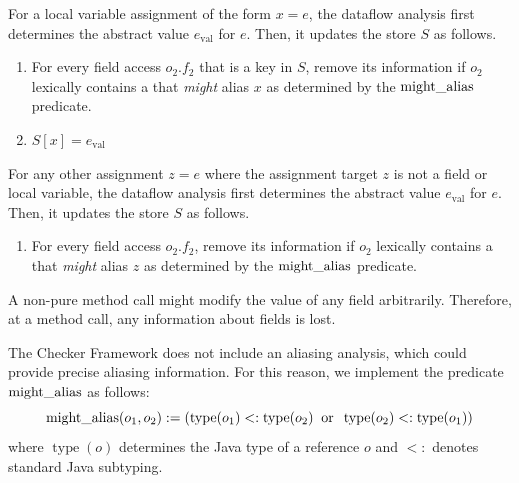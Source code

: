
For a local variable assignment of the form $x = e$,
the dataflow analysis first determines the abstract value $e_\text{val}$ for
$e$.
Then, it updates the store $S$ as follows.
\begin{enumerate}
    \item For every field access $o_2.f_2$ that is a key in $S$,
      remove its information if $o_2$ lexically contains a
       that \emph{might} alias $x$ as determined
      by the $\operatorname{might\_alias}$ predicate.
    \item $S[x] = e_\text{val}$
\end{enumerate}


For any other assignment $z = e$ where the
assignment target $z$ is not a field or local variable,
the dataflow analysis first determines the abstract value $e_\text{val}$ for
$e$.
Then, it updates the store $S$ as follows.
\begin{enumerate}
    \item For every field access $o_2.f_2$, remove its information if
    $o_2$ lexically contains a  that \emph{might}
    alias $z$ as determined by the $\operatorname{might\_alias}$ predicate.
\end{enumerate}



A non-pure method call might modify the value of any field arbitrarily.
Therefore, at a method call, any information about fields is lost.


\label{sec:alias}

The Checker Framework does not include an aliasing analysis, which could
provide precise aliasing information.  For this reason, we implement the
predicate $\operatorname{might\_alias}$ as follows:
\[ \operatorname{might\_alias}(o_1,o_2) :=
\left(\operatorname{type}(o_1) <: \operatorname{type}(o_2)
\;\;\text{or}\;\;
\operatorname{type}(o_2) <: \operatorname{type}(o_1) \right) \]
where $\operatorname{type}(o)$ determines the Java type of a reference $o$
and $<:$ denotes standard Java subtyping.


